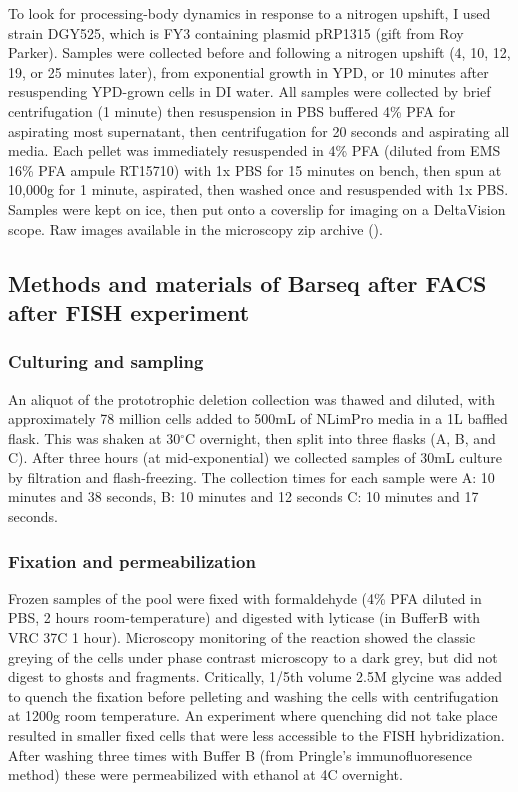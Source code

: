 To look for processing-body dynamics in response to
a nitrogen upshift, I used strain DGY525, which is FY3
containing plasmid pRP1315 (gift from Roy Parker).
Samples were collected before and following a nitrogen upshift
(4, 10, 12, 19, or 25 minutes later),
from exponential growth in YPD, 
or 10 minutes after resuspending YPD-grown cells in DI water.
All samples were collected by brief centrifugation (1 minute)
then resuspension in PBS buffered 4\% PFA for 
aspirating most supernatant, then centrifugation for 20 seconds
and aspirating all media. Each pellet was 
immediately resuspended in 4\% PFA 
(diluted from EMS 16\% PFA ampule RT15710) 
with 1x PBS for 15 minutes on bench, 
then spun at 10,000g for 1 minute, aspirated, 
then washed once and resuspended with 1x PBS. 
Samples were kept on ice, then put onto a coverslip
for imaging on a DeltaVision scope. Raw images available in the
microscopy zip archive ().

\subsection{Methods and materials of Barseq after FACS after FISH experiment}

\subsubsection{Culturing and sampling}

An aliquot of the prototrophic deletion collection
\parencite{vandersluis2014broad} was thawed and diluted, with 
approximately 78 million cells added to 500mL of NLimPro media 
in a 1L baffled flask. This was shaken at 30$^{\circ}$C overnight, 
then split into three flasks (A, B, and C). 
After three hours (at mid-exponential)
we collected samples of 30mL culture by filtration and flash-freezing.
The collection times for each
sample were A: 10 minutes and 38 seconds, B: 10 minutes and 12 seconds
C: 10 minutes and 17 seconds.

\subsubsection{Fixation and permeabilization}

Frozen samples of the pool were fixed with formaldehyde
(4\% PFA diluted in PBS, 2 hours room-temperature) and digested
with lyticase (in BufferB with VRC 37C 1 hour).
Microscopy monitoring of the reaction showed the classic
greying of the cells under phase contrast microscopy to a dark grey, 
but did not digest to ghosts and fragments. 
Critically, 1/5th volume 2.5M glycine was added to quench the 
fixation before pelleting and washing the cells with centrifugation
at 1200g room temperature. An experiment where quenching did not
take place resulted in smaller fixed cells that were less accessible
to the FISH hybridization.
After washing three times with Buffer B (from Pringle's
immunofluoresence method) these were permeabilized with ethanol at
4C overnight.

